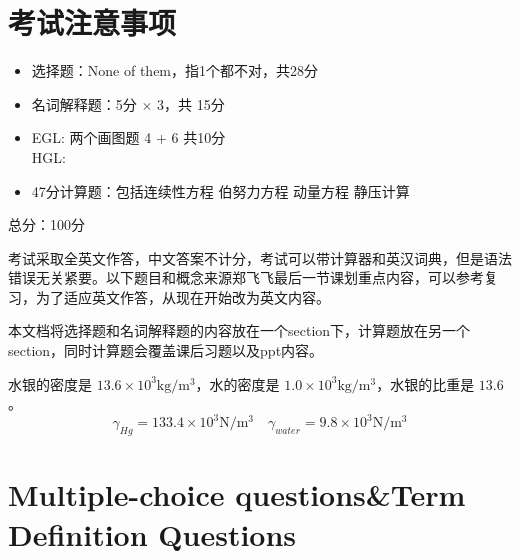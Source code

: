 \documentclass[12pt,a4paper]{article}
\newcounter{question}
\begin{document}
\section{考试注意事项}

\begin{mybox}
\begin{itemize}
  \item 选择题：None of them，指1个都不对，共28分
  \item 名词解释题：5分 $\times$ 3，共 15分
  \item EGL: \quad 两个画图题 4 + 6 共10分 \\
  HGL:
  \item 47分计算题：包括连续性方程 \quad 伯努力方程 \quad 动量方程 \quad 静压计算
\end{itemize}

总分：100分
\end{mybox}



考试采取全英文作答，中文答案不计分，考试可以带计算器和英汉词典，但是语法错误无关紧要。以下题目和概念来源郑飞飞最后一节课划重点内容，可以参考复习，为了适应英文作答，从现在开始改为英文内容。

本文档将选择题和名词解释题的内容放在一个section下，计算题放在另一个section，同时计算题会覆盖课后习题以及ppt内容。

水银的密度是 $13.6 \times 10^3 \mathrm{kg/m^3}$，水的密度是 $1.0 \times 10^3 \mathrm{kg/m^3}$，水银的比重是 $13.6$。
\[
\gamma_{Hg} = 133.4 \times 10^3 \mathrm{N/m^3} \quad \gamma_{water} = 9.8 \times 10^3 \mathrm{N/m^3}
\]
\newpage


\section{Multiple-choice questions\&Term Definition Questions}
\end{document}
